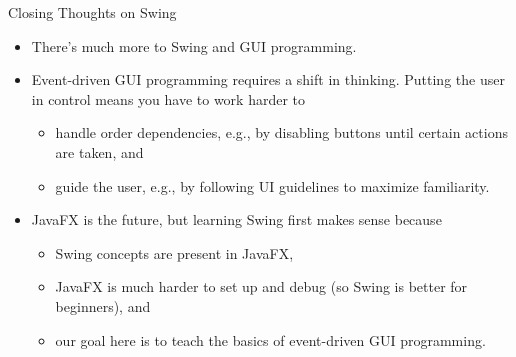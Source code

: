 \documentclass{beamer}
\begin{document}
\begin{frame}[fragile]{Closing Thoughts on Swing}


\begin{itemize}
\item There's much more to Swing and GUI programming.
\item Event-driven GUI programming requires a shift in thinking.  Putting the user in control means you have to work harder to
\begin{itemize}
  \item handle order dependencies, e.g., by disabling buttons until certain actions are taken, and
  \item guide the user, e.g., by following UI guidelines to maximize familiarity.
\end{itemize}
\item JavaFX is the future, but learning Swing first makes sense because
\begin{itemize}
  \item Swing concepts are present in JavaFX,
  \item JavaFX is much harder to set up and debug (so Swing is better for beginners), and
  \item our goal here is to teach the basics of event-driven GUI programming.
\end{itemize}

\end{itemize}


\end{frame}









\end{document}
